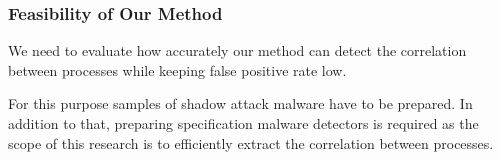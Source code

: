 \subsubsection{Feasibility of Our Method}
We need to evaluate how accurately our method can detect the correlation between processes
while keeping false positive rate low.

For this purpose samples of shadow attack malware have to be prepared. In addition to that,
preparing specification malware detectors is required as the scope of this research is to
efficiently extract the correlation between processes.
